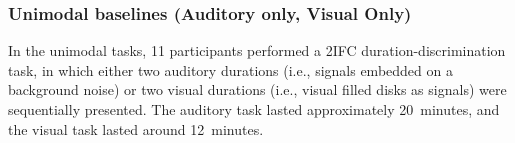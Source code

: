 \documentclass{biorxiv}
\begin{document}

\subsubsection{Unimodal baselines (Auditory only, Visual Only)}
In the unimodal tasks, 11 participants performed a 2IFC duration-discrimination task, in which either two auditory durations (i.e., signals embedded on a background noise) or two visual durations (i.e., visual filled disks as signals) were sequentially presented. The auditory task lasted approximately 20~minutes, and the visual task lasted around 12~minutes. 
\end{document}
